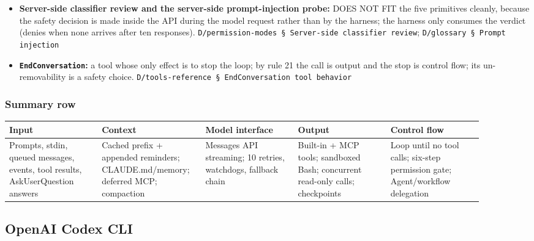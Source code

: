 \begin{itemize}
\item \textbf{Server-side classifier review and the server-side prompt-injection probe:} DOES NOT FIT the five primitives cleanly, because the safety decision is made inside the API during the model request rather than by the harness; the harness only consumes the verdict (denies when none arrives after ten responses). \texttt{D/\allowbreak{}permission-\allowbreak{}modes § Server-\allowbreak{}side classifier review}; \texttt{D/\allowbreak{}glossary § Prompt injection}
\item \textbf{\texttt{EndConversation}:} a tool whose only effect is to stop the loop; by rule 21 the call is output and the stop is control flow; its un-removability is a safety choice. \texttt{D/\allowbreak{}tools-\allowbreak{}reference § EndConversation tool behavior}
\end{itemize}

\subsubsection*{Summary row}
\begin{longtable}{@{}p{0.18\linewidth}p{0.18\linewidth}p{0.18\linewidth}p{0.18\linewidth}p{0.18\linewidth}@{}}
\toprule \textbf{Input} & \textbf{Context} & \textbf{Model interface} & \textbf{Output} & \textbf{Control flow} \\ \midrule \endhead
Prompts, stdin, queued messages, events, tool results, AskUserQuestion answers & Cached prefix + appended reminders; CLAUDE.md/memory; deferred MCP; compaction & Messages API streaming; 10 retries, watchdogs, fallback chain & Built-in + MCP tools; sandboxed Bash; concurrent read-only calls; checkpoints & Loop until no tool calls; six-step permission gate; Agent/workflow delegation \\
\bottomrule \end{longtable}


\subsection{OpenAI Codex CLI}

